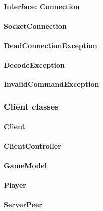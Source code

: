 \documentclass[12pt, letterpaper]{article}
\begin{document}
    \paragraph{Interface: Connection}

    \paragraph{SocketConnection}

    \paragraph{DeadConnectionException}

    \paragraph{DecodeException}

    \paragraph{InvalidCommandException}



    \subsubsection{Client classes}

    \paragraph{Client}

    \paragraph{ClientController}

    \paragraph{GameModel}

    \paragraph{Player}

    \paragraph{ServerPeer}
\end{document}
